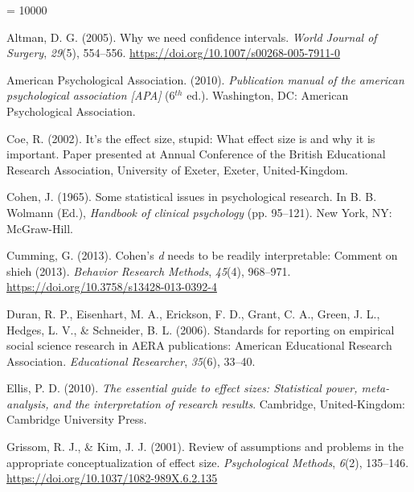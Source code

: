 \documentclass[
  english,
  man,floatsintext]{apa6}
\newlength{\cslhangindent}
\newlength{\cslentryspacingunit} %
\newenvironment{CSLReferences}[2] %
 {%
  \setlength{\parindent}{0pt}
  \ifodd #1
  \let\oldpar\par
  \def\par{\hangindent=\cslhangindent\oldpar}
  \fi
  \setlength{\parskip}{#2\cslentryspacingunit}
 }%
 {}
\begin{document}
\begingroup

\interlinepenalty = 10000

\hypertarget{refs}{}
\begin{CSLReferences}{1}{0}
\leavevmode{}%
Altman, D. G. (2005). Why we need confidence intervals. \emph{World {J}ournal of {S}urgery}, \emph{29}(5), 554--556. \url{https://doi.org/10.1007/s00268-005-7911-0}

\leavevmode{}%
American Psychological Association. (2010). \emph{Publication manual of the american psychological association {[}{APA}{]}} (6\(^{th}\) ed.). Washington, {DC}: American Psychological Association.

\leavevmode{}%
Coe, R. (2002). It's the effect size, stupid: What effect size is and why it is important. Paper presented at Annual Conference of the {B}ritish {E}ducational {R}esearch {A}ssociation, University of Exeter, Exeter, {U}nited-{K}ingdom.

\leavevmode{}%
Cohen, J. (1965). Some statistical issues in psychological research. In B. B. Wolmann (Ed.), \emph{Handbook of clinical psychology} (pp. 95--121). New York, NY: McGraw-Hill.

\leavevmode{}%
Cumming, G. (2013). Cohen's \emph{d} needs to be readily interpretable: Comment on shieh (2013). \emph{Behavior Research Methods}, \emph{45}(4), 968--971. \url{https://doi.org/10.3758/s13428-013-0392-4}

\leavevmode{}%
Duran, R. P., Eisenhart, M. A., Erickson, F. D., Grant, C. A., Green, J. L., Hedges, L. V., \& Schneider, B. L. (2006). Standards for reporting on empirical social science research in {AERA} publications: {A}merican {E}ducational {R}esearch {A}ssociation. \emph{Educational Researcher}, \emph{35}(6), 33--40.

\leavevmode{}%
Ellis, P. D. (2010). \emph{The essential guide to effect sizes: Statistical power, meta-analysis, and the interpretation of research results}. Cambridge, United-Kingdom: Cambridge University Press.

\leavevmode{}%
Grissom, R. J., \& Kim, J. J. (2001). Review of assumptions and problems in the appropriate conceptualization of effect size. \emph{Psychological Methods}, \emph{6}(2), 135--146. \url{https://doi.org/10.1037/1082-989X.6.2.135}


\end{CSLReferences}
\end{document}
